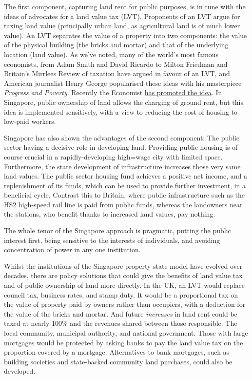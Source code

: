 \documentclass[]{tufte-handout}
\begin{document}
The first component, capturing land rent for public purposes, is in tune
with the ideas of advocates for a land value tax (LVT). Proponents of an
LVT argue for taxing land value (principally urban land, as agricultural
land is of much lower value). An LVT separates the value of a property
into two components: the value of the physical building (the bricks and
mortar) and that of the underlying location (land value). As we've
noted, many of the world's most famous economists, from Adam Smith and
David Ricardo to Milton Friedman and Britain's Mirrlees Review of
taxation have argued in favour of an LVT, and American journalist Henry
George popularised these ideas with his masterpiece \emph{Progress and
Poverty}. Recently the Economist
\href{https://www.economist.com/briefing/2018/08/09/the-time-may-be-right-for-land-value-taxes}{has
promoted the idea}. In Singapore, public ownership of land allows the
charging of ground rent, but this idea is implemented sensitively, with
a view to reducing the cost of housing to low-paid workers.

Singapore has also shown the advantages of the second component: The
public sector having a decisive role in developing land. Providing
public housing is of course crucial in a rapidly-developing high=wage
city with limited space. Furthermore, the state development of
infrastructure increases those very same land values. The public sector
housing fund achieves a positive net income, and a replenishment of its
funds, which can be used to provide further investment, in a beneficial
cycle. Contrast this to Britain, where public infrastructure such as the
HS2 high-speed rail line is paid from public funds, whereas the
landowners near the stations, who benefit thanks to increased land
values, pay nothing.

The whole tenor of the Singapore approach is pragmatic, putting the
public interest first, being sensitive to the interests of individuals,
and avoiding concentration of power in any one institution.

Whilst the institutions of the Singapore property state model have
evolved over decades, there are policy solutions that could give the
benefits of land value tax and of public ownership of land more
directly. In the UK, an LVT would replace council tax, business rates,
and stamp duty. It would be a proportional tax on the value of property
paid by owners rather than occupiers, with a deduction for the value of
the bricks and mortar. And future \emph{increases} in land rent could be
taxed at nearly 100\% and the revenues shared between those responsible:
The local community, municipal authority, and national government. Those
with large mortgages would be protected by asking banks to pay the land
value tax on the proportion covered by a mortgage. Alternatives to bank
mortgages, such as building societies and state-backed community land
purchases, could also be developed.
\end{document}
